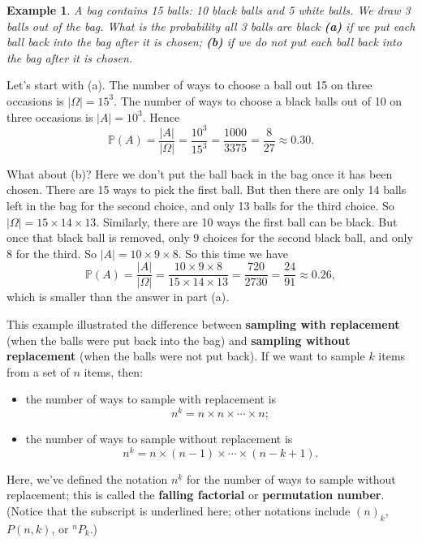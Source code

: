 \documentclass[
  a4paper,
]{book}
\providecommand{\tightlist}{%
  \setlength{\itemsep}{0pt}\setlength{\parskip}{0pt}}
\theoremstyle{definition}
\theoremstyle{definition}
\newtheorem{example}{Example}[chapter]
\theoremstyle{definition}
\theoremstyle{definition}
\theoremstyle{remark}
\begin{document}
\begin{example}
\emph{A bag contains 15 balls: 10 black balls and 5 white balls. We draw 3 balls out of the bag. What is the probability all 3 balls are black \textbf{(a)} if we put each ball back into the bag after it is chosen; \textbf{(b)} if we do not put each ball back into the bag after it is chosen.}

Let's start with (a). The number of ways to choose a ball out 15 on three occasions is \(|\Omega| = 15^3\). The number of ways to choose a black balls out of 10 on three occasions is \(|A| = 10^3\). Hence
\[ \mathbb P(A) = \frac{|A|}{|\Omega|} = \frac{10^3}{15^3} =  \frac{1000}{3375} = \frac{8}{27} \approx 0.30. \]

What about (b)? Here we don't put the ball back in the bag once it has been chosen. There are 15 ways to pick the first ball. But then there are only 14 balls left in the bag for the second choice, and only 13 balls for the third choice. So \(|\Omega| = 15\times14\times13\). Similarly, there are 10 ways the first ball can be black. But once that black ball is removed, only 9 choices for the second black ball, and only 8 for the third. So \(|A| = 10\times9\times8\). So this time we have
\[ \mathbb P(A) = \frac{|A|}{|\Omega|} = \frac{10\times9\times8}{15\times14\times13} =  \frac{720}{2730} = \frac{24}{91} \approx 0.26, \]
which is smaller than the answer in part (a).
\end{example}

This example illustrated the difference between \textbf{sampling with replacement} (when the balls were put back into the bag) and \textbf{sampling without replacement} (when the balls were not put back). If we want to sample \(k\) items from a set of \(n\) items, then:

\begin{itemize}
\tightlist
\item
  the number of ways to sample with replacement is
  \[ n^k = n\times n\times\cdots\times n;  \]
\item
  the number of ways to sample without replacement is
  \[ {n}^{\underline{k}} = n\times(n-1)\times \cdots\times (n-k+1) .\]
\end{itemize}

Here, we've defined the notation \({n}^{\underline{k}}\) for the number of ways to sample without replacement; this is called the \textbf{falling factorial} or \textbf{permutation number}. (Notice that the subscript is underlined here; other notations include \((n)_k\), \(P(n,k)\), or \({}^nP_k\).)
\end{document}
